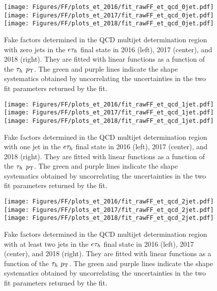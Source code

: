 \begin{figure}[ht!b]
\centering
\texttt{[image: Figures/FF/plots\_et\_2016/fit\_rawFF\_et\_qcd\_0jet.pdf]}
\texttt{[image: Figures/FF/plots\_et\_2017/fit\_rawFF\_et\_qcd\_0jet.pdf]}
\texttt{[image: Figures/FF/plots\_et\_2018/fit\_rawFF\_et\_qcd\_0jet.pdf]}\\
\caption{\label{fig:fit_raw_et_0jet_qcd} Fake factors determined in the QCD multijet determination region with zero jets in the $e\tau_h$ final state in 2016 (left), 2017 (center), and 2018 (right). They are fitted with linear functions as a function of the $\tau_h$ $p_{\mathrm{T}}$. The green and purple lines indicate the shape systematics obtained by uncorrelating the uncertainties in the two fit parameters returned by the fit.  }
\end{figure}


\begin{figure}[ht!b]
\centering
\texttt{[image: Figures/FF/plots\_et\_2016/fit\_rawFF\_et\_qcd\_1jet.pdf]}
\texttt{[image: Figures/FF/plots\_et\_2017/fit\_rawFF\_et\_qcd\_1jet.pdf]}
\texttt{[image: Figures/FF/plots\_et\_2018/fit\_rawFF\_et\_qcd\_1jet.pdf]}\\
\caption{\label{fig:fit_raw_et_1jet_qcd} Fake factors determined in the QCD multijet determination region with one jet in the $e\tau_h$ final state in 2016 (left), 2017 (center), and 2018 (right). They are fitted with linear functions as a function of the $\tau_h$ $p_{\mathrm{T}}$. The green and purple lines indicate the shape systematics obtained by uncorrelating the uncertainties in the two fit parameters returned by the fit.  }
\end{figure}

\begin{figure}[ht!b]
\centering
\texttt{[image: Figures/FF/plots\_et\_2016/fit\_rawFF\_et\_qcd\_2jet.pdf]}
\texttt{[image: Figures/FF/plots\_et\_2017/fit\_rawFF\_et\_qcd\_2jet.pdf]}
\texttt{[image: Figures/FF/plots\_et\_2018/fit\_rawFF\_et\_qcd\_2jet.pdf]}\\
\caption{\label{fig:fit_raw_et_2jet_qcd} Fake factors determined in the QCD multijet determination region with at least two jets in the $e\tau_h$ final state in 2016 (left), 2017 (center), and 2018 (right). They are fitted with linear functions as a function of the $\tau_h$ $p_{\mathrm{T}}$. The green and purple lines indicate the shape systematics obtained by uncorrelating the uncertainties in the two fit parameters returned by the fit.  }
\end{figure}



